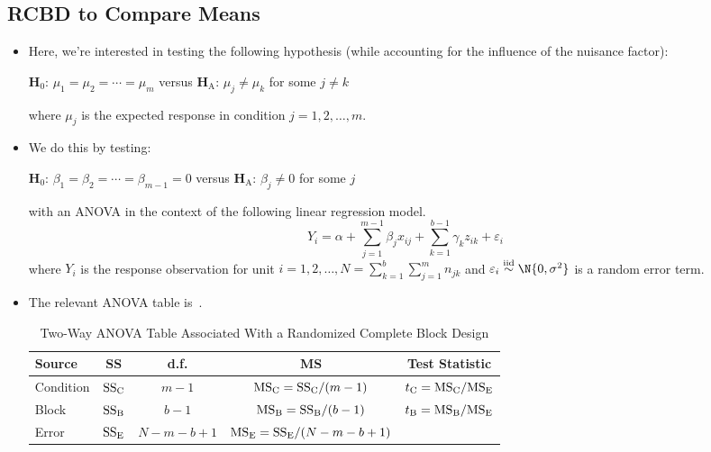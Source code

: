 \subsection{RCBD to Compare Means}
\begin{itemize}
    \item Here, we're interested in testing the following hypothesis (while accounting for the influence of the
          nuisance factor):
          \begin{tightcenter}
              $ \mathbf{H}_0 $: $ \mu_1=\mu_2=\cdots=\mu_m $ versus $ \mathbf{H}_\text{A} $: $ \mu_j\ne \mu_k $ for some $ j\ne k $
          \end{tightcenter}
          where $ \mu_j $ is the expected response in condition $ j=1,2,\ldots,m $.
    \item We do this by testing:
          \begin{tightcenter}
              $ \mathbf{H}_0 $: $ \beta_1=\beta_2=\cdots=\beta_{m-1}=0 $ versus $ \mathbf{H}_\text{A} $: $ \beta_j\ne 0 $ for some $ j $
          \end{tightcenter}
          with an ANOVA in the context of the following linear regression model.
          \[ Y_i=\alpha+\sum_{j=1}^{m-1} \beta_j x_{ij}+\sum_{k=1}^{b-1} \gamma_k z_{ik}+\varepsilon_i \]
          where $ Y_i $ is the response observation for unit $ i=1,2,\ldots,N=\sum_{k=1}^{b} \sum_{j=1}^{m} n_{jk} $
          and $ \varepsilon_i \stackrel{\text{iid}}{\sim}\N{0,\sigma^2} $ is a random error term.
    \item The relevant ANOVA table is~.
          \begin{table}[!htbp]
              \centering
              \caption{Two-Way ANOVA Table Associated With a Randomized Complete Block Design}\label{two_way_ANOVA_RCBD}
              \begin{NiceTabular}{|l|c|c|c|c|}
                  \toprule
                  Source    & SS                     & d.f.        & MS                                                                   & Test Statistic                                           \\
                  \midrule
                  Condition & $ \text{SS}_{\text{C}} $ & $ m-1 $     & $ \text{MS}_{\text{C}}=\text{SS}_{\text{C}}/(m-1) $     & $ t_\text{C}=\text{MS}_{\text{C}}/\text{MS}_{\text{E}} $ \\
                  Block     & $ \text{SS}_{\text{B}} $ & $ b-1 $     & $ \text{MS}_{\text{B}}=\text{SS}_{\text{B}}/(b-1) $     & $ t_\text{B}=\text{MS}_{\text{B}}/\text{MS}_{\text{E}} $ \\
                  Error     & $ \text{SS}_{\text{E}} $ & $ N-m-b+1 $ & $ \text{MS}_{\text{E}}=\text{SS}_{\text{E}}/(N-m-b+1) $ &                                                      \\

\end{NiceTabular}
\end{table}
\end{itemize}
